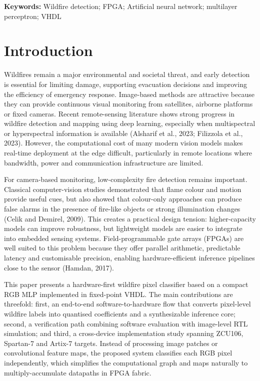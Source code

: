 \documentclass[11pt,a4paper]{article}
\begin{document}
\textbf{Keywords:} Wildfire detection; FPGA; Artificial neural network; multilayer perceptron; VHDL

\section{Introduction}

Wildfires remain a major environmental and societal threat, and early detection is essential for limiting damage, supporting evacuation decisions and improving the efficiency of emergency response. Image-based methods are attractive because they can provide continuous visual monitoring from satellites, airborne platforms or fixed cameras. Recent remote-sensing literature shows strong progress in wildfire detection and mapping using deep learning, especially when multispectral or hyperspectral information is available (Alsharif et al., 2023; Filizzola et al., 2023). However, the computational cost of many modern vision models makes real-time deployment at the edge difficult, particularly in remote locations where bandwidth, power and communication infrastructure are limited.

For camera-based monitoring, low-complexity fire detection remains important. Classical computer-vision studies demonstrated that flame colour and motion provide useful cues, but also showed that colour-only approaches can produce false alarms in the presence of fire-like objects or strong illumination changes (Celik and Demirel, 2009). This creates a practical design tension: higher-capacity models can improve robustness, but lightweight models are easier to integrate into embedded sensing systems. Field-programmable gate arrays (FPGAs) are well suited to this problem because they offer parallel arithmetic, predictable latency and customisable precision, enabling hardware-efficient inference pipelines close to the sensor (Hamdan, 2017).

This paper presents a hardware-first wildfire pixel classifier based on a compact RGB MLP implemented in fixed-point VHDL. The main contributions are threefold: first, an end-to-end software-to-hardware flow that converts pixel-level wildfire labels into quantised coefficients and a synthesizable inference core; second, a verification path combining software evaluation with image-level RTL simulation; and third, a cross-device implementation study spanning ZCU106, Spartan-7 and Artix-7 targets. Instead of processing image patches or convolutional feature maps, the proposed system classifies each RGB pixel independently, which simplifies the computational graph and maps naturally to multiply-accumulate datapaths in FPGA fabric.
\end{document}
